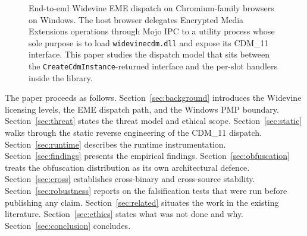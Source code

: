 \documentclass[11pt,letterpaper]{article}
\begin{document}
\begin{figure}[t]
\centering
{}
\caption{End-to-end Widevine EME dispatch on Chromium-family browsers
on Windows.  The host browser delegates Encrypted Media Extensions
operations through Mojo IPC to a utility process whose sole purpose is
to load \texttt{widevinecdm.dll} and expose its CDM\_11 interface.
This paper studies the dispatch model that sits between the
\texttt{CreateCdmInstance}-returned interface and the per-slot
handlers inside the library.}
\label{fig:system-overview}
\end{figure}

The paper proceeds as follows.  Section~\ref{sec:background}
introduces the Widevine licensing levels, the EME dispatch path, and
the Windows PMP boundary.  Section~\ref{sec:threat} states the threat
model and ethical scope.  Section~\ref{sec:static} walks through the
static reverse engineering of the CDM\_11 dispatch.
Section~\ref{sec:runtime} describes the runtime instrumentation.
Section~\ref{sec:findings} presents the empirical findings.
Section~\ref{sec:obfuscation} treats the obfuscation distribution as
its own architectural defence.
Section~\ref{sec:cross} establishes cross-binary and cross-source
stability.  Section~\ref{sec:robustness} reports on the
falsification tests that were run before publishing any claim.
Section~\ref{sec:related} situates the work in the existing
literature.  Section~\ref{sec:ethics} states what was not done and
why.  Section~\ref{sec:conclusion} concludes.
\end{document}
